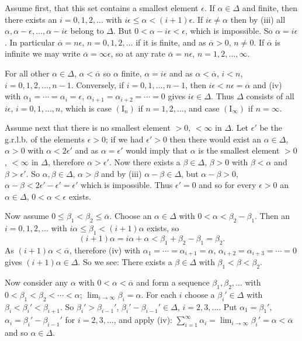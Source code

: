 \documentclass[12pt,b5paper,twoside]{article}
\begin{document}
Assume first, that this set contains a smallest element $\epsilon$. If
$\alpha\in\Delta$ and finite, then there exists an $i=0,1,2,\ldots$ with
$i\epsilon\leq\alpha<(i+1)\epsilon$. If $i\epsilon\ne\alpha$ then by (iii) all
$\alpha,\alpha-\epsilon,\ldots,\alpha-i\epsilon$ belong to $\Delta$. But
$0<\alpha-i\epsilon<\epsilon$, which is impossible. So
$\alpha=i\epsilon$. In particular
$\overline\alpha=n\epsilon$, $n=0,1,2,\ldots$ if it is finite, and as
$\overline\alpha>0$, $n\ne0$. If $\overline\alpha$ is infinite we may write
$\overline\alpha=\infty\epsilon$, so at any rate
$\overline\alpha=n\epsilon$, $n=1,2,\ldots,\infty$.

For all other $\alpha\in\Delta$, $\alpha<\overline\alpha$ so $\alpha$ finite,
$\alpha=i\epsilon$ and as $\alpha<\overline\alpha$, $i<n$,
$i=0,1,2,\ldots,n-1$. Conversely, if $i=0,1,\ldots,n-1$, then
$i\epsilon<n\epsilon=\overline\alpha$ and (iv) with
$\alpha_1=\cdots=\alpha_i=\epsilon$,
$\alpha_{i+1}=\alpha_{i+2}=\cdots=0$ gives $i\epsilon\in\Delta$. Thus
$\Delta$ consists of all $i\epsilon$, $i=0,1,\ldots,n$, which is case
$(\mathrm I_n)$ if $n=1,2,\ldots$, and case $(\mathrm I_\infty)$ if
$n=\infty$.

Assume next that there is no smallest element $>0$, $<\infty$ in $\Delta$.
Let $\epsilon'$ be the g.r.l.b. of the elements $\epsilon>0$; if we had
$\epsilon'>0$ then there would exist an $\alpha\in\Delta$, $\alpha>0$ with
$\alpha<2\epsilon'$ and as $\alpha=\epsilon'$ would imply that $\alpha$ is the
smallest element $>0$, $<\infty$ in $\Delta$, therefore $\alpha>\epsilon'$.
Now there exists a $\beta\in\Delta$, $\beta>0$ with $\beta<\alpha$ and
$\beta>\epsilon'$. So $\alpha,\beta\in\Delta$, $\alpha>\beta$ and by (iii)
$\alpha-\beta\in\Delta$, but $\alpha-\beta>0$,
$\alpha-\beta<2\epsilon'-\epsilon'=\epsilon'$ which is impossible. Thus
$\epsilon'=0$ and so for every $\epsilon>0$ an $\alpha\in\Delta$,
$0<\alpha<\epsilon$ exists.

Now assume $0\leq\beta_1<\beta_2\leq\overline\alpha$. Choose an
$\alpha\in\Delta$ with $0<\alpha<\beta_2-\beta_1$. Then an
$i=0,1,2,\ldots$ with $i\alpha\leq\beta_1<(i+1)\alpha$ exists, so
\[
 (i+1)\alpha=i\alpha+\alpha<\beta_1+\beta_2-\beta_1=\beta_2.
\]
As $(i+1)\alpha<\overline\alpha$, therefore (iv) with
$\alpha_1=\cdots=\alpha_{i+1}=\alpha$,
$\alpha_{i+2}=\alpha_{i+3}=\cdots=0$ gives $(i+1)\alpha\in\Delta$. So we see:
There exists a $\beta\in\Delta$ with $\beta_1<\beta<\beta_2$.

Now consider any $\alpha$ with $0<\alpha<\overline\alpha$ and form a sequence
$\beta_1,\beta_2,\ldots$ with
$0<\beta_1<\beta_2<\cdots<\alpha$;
$\lim_{i\to\infty}\beta_i=\alpha$. For each $i$ choose a
$\beta_i'\in\Delta$ with $\beta_i<\beta_i'<\beta_{i+1}$. So
$\beta_i'>\beta_{i-1}'$, $\beta_i'-\beta_{i-1}'\in\Delta$, $i=2,3,\ldots$.
Put $\alpha_1=\beta_1'$, $\alpha_i=\beta_i'-\beta_{i-1}'$ for
$i=2,3,\ldots$, and apply (iv):
$\sum_{i=1}^\infty\alpha_i=\lim_{i\to\infty}\beta_i'=\alpha
<\overline\alpha$ and so $\alpha\in\Delta$.
\end{document}
